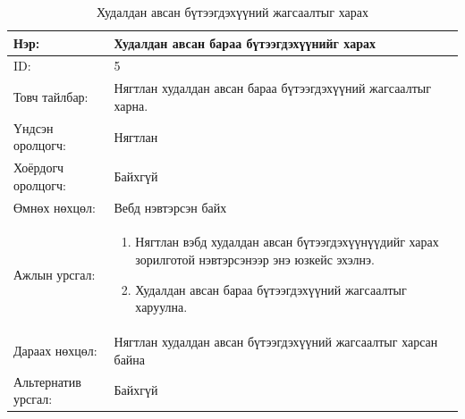 \begin{center}
	\begin{table}[!htbp]
		\caption{Худалдан авсан бүтээгдэхүүний жагсаалтыг харах}
		\begin{tabular}{|p{4cm}|p{10cm}|}
			\hline
			Нэр: & Худалдан авсан бараа бүтээгдэхүүнийг харах  \\
			\hline
			ID: & 5 \\
			\hline
			Товч тайлбар: & Нягтлан худалдан авсан бараа бүтээгдэхүүний жагсаалтыг харна.  \\
			\hline
			Үндсэн оролцогч: & Нягтлан \\
			\hline
			Хоёрдогч оролцогч: & Байхгүй  \\
			\hline
			Өмнөх нөхцөл: &  Вебд нэвтэрсэн байх \\
			\hline
			Ажлын урсгал: &  \begin{enumerate}
				\item Нягтлан вэбд худалдан авсан бүтээгдэхүүнүүдийг харах зорилготой нэвтэрсэнээр энэ юзкейс эхэлнэ.
				\item Худалдан авсан бараа бүтээгдэхүүний жагсаалтыг харуулна. 
			\end{enumerate}	 \\
			\hline
			Дараах нөхцөл: & Нягтлан худалдан авсан бүтээгдэхүүний жагсаалтыг  харсан байна \\
			\hline 
			Альтернатив урсгал: & Байхгүй \\
			\hline
		\end{tabular}
	\end{table}
\end{center}


